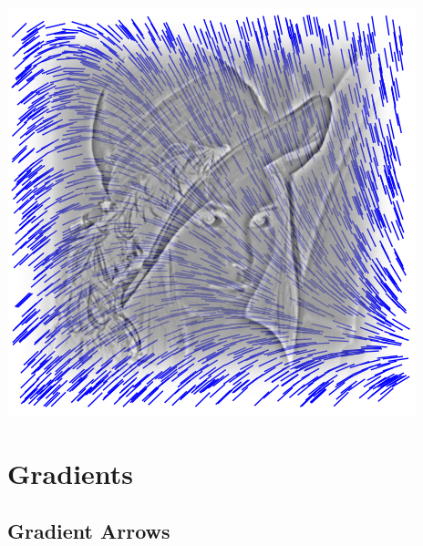 \documentclass[a4paper,12px]{article}
\begin{document}
\vspace{2cm}
\begin{center}
    \includegraphics[width=(\textwidth/6*5)]{front}
\end{center}
\clearpage

\tableofcontents
\vspace{5mm}

\captionsetup{width=\textwidth/7*5}


\section{Gradients}
\subsection{Gradient Arrows}
\end{document}
